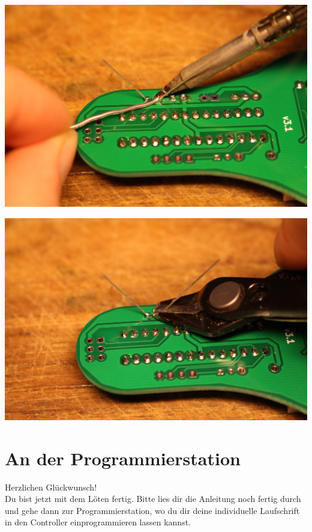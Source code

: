 \documentclass{article}
\begin{document}
\begin{minipage}[b]{0.5\textwidth}
	\includegraphics[width=\textwidth]{Bilder2021/IMG_8164.JPG}
\end{minipage}
\begin{minipage}[b]{0.5\textwidth}
	\includegraphics[width=\textwidth]{Bilder2021/IMG_8165.JPG}
\end{minipage}

\section{An der Programmierstation}

Herzlichen Glückwunsch! \\

Du bist jetzt mit dem Löten fertig. Bitte lies dir die Anleitung noch fertig durch und gehe dann zur Programmierstation, wo du dir deine individuelle Laufschrift in den Controller einprogrammieren lassen kannst.
\end{document}

